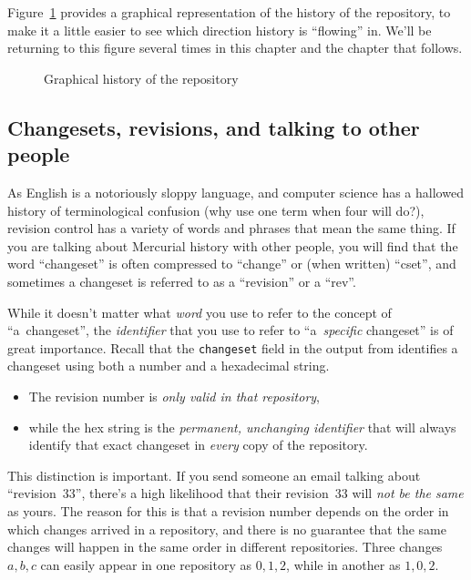 Figure~\ref{fig:tour-basic:history} provides a graphical representation of
the history of the  repository, to make it a little
easier to see which direction history is ``flowing'' in.  We'll be
returning to this figure several times in this chapter and the chapter
that follows.

\begin{figure}[ht]
  \centering
  \caption{Graphical history of the  repository}
  \label{fig:tour-basic:history}
\end{figure}

\subsection{Changesets, revisions, and talking to other 
  people}

As English is a notoriously sloppy language, and computer science has
a hallowed history of terminological confusion (why use one term when
four will do?), revision control has a variety of words and phrases
that mean the same thing.  If you are talking about Mercurial history
with other people, you will find that the word ``changeset'' is often
compressed to ``change'' or (when written) ``cset'', and sometimes a
changeset is referred to as a ``revision'' or a ``rev''.

While it doesn't matter what \emph{word} you use to refer to the
concept of ``a~changeset'', the \emph{identifier} that you use to
refer to ``a~\emph{specific} changeset'' is of great importance.
Recall that the \texttt{changeset} field in the output from
 identifies a changeset using both a number and a
hexadecimal string.
\begin{itemize}
\item The revision number is \emph{only valid in that repository},
\item while the hex string is the \emph{permanent, unchanging
    identifier} that will always identify that exact changeset in
  \emph{every} copy of the repository.
\end{itemize}
This distinction is important.  If you send someone an email talking
about ``revision~33'', there's a high likelihood that their
revision~33 will \emph{not be the same} as yours.  The reason for this
is that a revision number depends on the order in which changes
arrived in a repository, and there is no guarantee that the same
changes will happen in the same order in different repositories.
Three changes $a,b,c$ can easily appear in one repository as $0,1,2$,
while in another as $1,0,2$.

